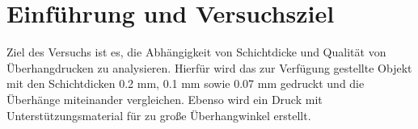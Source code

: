 \documentclass[a4paper,12pt,bibtotocnumbered]{scrartcl}
\numberwithin{equation}{section} %
\begin{document}
\thispagestyle{empty}
\tableofcontents 
\clearpage %


\renewcommand{\thepage}{\arabic{page}}
\setcounter{page}{1}



\listoffigures
{}

\listoftables
{}

\newpage
\onehalfspacing 

\section[Einführung]{Einführung und Versuchsziel}

Ziel des Versuchs ist es, die Abhängigkeit von Schichtdicke und Qualität von Überhangdrucken zu analysieren. Hierfür wird das zur Verfügung gestellte Objekt mit den Schichtdicken 0.2 mm, 0.1 mm sowie 0.07 mm gedruckt und die Überhänge miteinander vergleichen. Ebenso wird ein Druck mit Unterstützungsmaterial für zu große Überhangwinkel erstellt.
\end{document}
